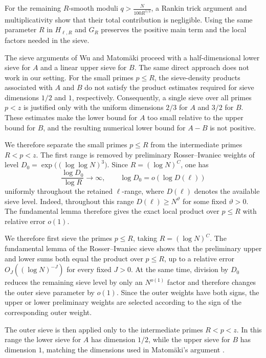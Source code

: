 \documentclass[12pt,reqno]{amsart}
\numberwithin{equation}{section}
\theoremstyle{definition}
\theoremstyle{remark}
\begin{document}
For the remaining \(R\)-smooth moduli \(q>\frac{N}{100R^{1/2}}\), a Rankin trick argument and
multiplicativity show that their total contribution is negligible.
Using the same parameter \(R\) in \(H_{\ell,R}\) and \(G_R\) preserves
the positive main term and the local factors needed in the sieve.


The sieve arguments of Wu and Matom\"aki proceed with a
half-dimensional lower sieve for \(A\) and a linear upper sieve for
\(B\).  The same direct approach does not work in our setting. For the small primes \(p\leq R\), the sieve-density products associated
with \(A\) and \(B\) do not satisfy the product estimates required for
sieve dimensions \(1/2\) and \(1\), respectively.  Consequently, a
single sieve over all primes \(p<z\) is justified only with the uniform
dimensions \(2/3\) for \(A\) and \(3/2\) for \(B\). These estimates make the lower bound for \(A\)
too small relative to the upper bound for \(B\), and the resulting
numerical lower bound for $A-B$ is not positive.

We therefore separate the small primes \(p\leq R\) from the
intermediate primes \(R<p<z\). The first range is removed by preliminary Rosser--Iwaniec weights of
level $ D_0=\exp\bigl((\log\log N)^3\bigr).
$
Since \(R=(\log N)^C\), one has
\[
 \frac{\log D_0}{\log R}\longrightarrow\infty,
 \qquad
 \log D_0=o(\log D(\ell))
\]
uniformly throughout the retained \(\ell\)-range, where \(D(\ell)\)
denotes the available sieve level.  Indeed, throughout this range
\(D(\ell)\geq N^\vartheta\) for some fixed \(\vartheta>0\).  The
fundamental lemma therefore gives the exact  local product over
\(p\leq R\) with relative error \(o(1)\). 


We therefore first sieve the primes \(p\leq R\), taking $R=(\log N)^C$. 
The fundamental lemma of the Rosser--Iwaniec sieve shows that the
preliminary upper and lower sums both equal the product over
\(p\leq R\), up to a relative error \(O_J((\log N)^{-J})\) for every
fixed \(J>0\).  At the same time, division by \(D_0\) reduces the
remaining sieve level by only an \(N^{o(1)}\) factor and therefore
changes the outer sieve parameter by \(o(1)\).  Since the outer weights
have both signs, the upper or lower preliminary weights are selected
according to the sign of the corresponding outer weight.

The outer sieve is then applied only to the intermediate primes
\(R<p<z\).  In this range  the lower sieve for \(A\) has dimension \(1/2\), while
the upper sieve for \(B\) has dimension \(1\), matching the dimensions used in Matomäki's argument \cite{Mat07}.
\end{document}
